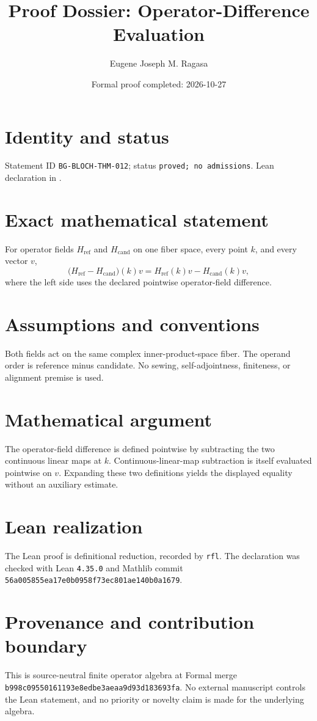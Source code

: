 \documentclass[11pt]{article}
\title{Proof Dossier: Operator-Difference Evaluation}
\author{Eugene Joseph M. Ragasa}
\date{Formal proof completed: 2026-10-27}
\begin{document}
\raggedright
\maketitle

\section{Identity and status}
Statement ID \texttt{BG-BLOCH-THM-012}; status \texttt{proved; no admissions}. Lean declaration
 in
.

\section{Exact mathematical statement}
For operator fields $H_{\mathrm{ref}}$ and $H_{\mathrm{cand}}$ on one fiber space, every
point $k$, and every vector $v$,
\[
  \bigl(H_{\mathrm{ref}}-H_{\mathrm{cand}}\bigr)(k)v
  =H_{\mathrm{ref}}(k)v-H_{\mathrm{cand}}(k)v,
\]
where the left side uses the declared pointwise operator-field difference.

\section{Assumptions and conventions}
Both fields act on the same complex inner-product-space fiber. The operand order is
reference minus candidate. No sewing, self-adjointness, finiteness, or alignment premise is used.

\section{Mathematical argument}
The operator-field difference is defined pointwise by subtracting the two continuous linear
maps at $k$. Continuous-linear-map subtraction is itself evaluated pointwise on $v$. Expanding
these two definitions yields the displayed equality without an auxiliary estimate.

\section{Lean realization}
The Lean proof is definitional reduction, recorded by \texttt{rfl}. The declaration was checked
with Lean \texttt{4.35.0} and Mathlib commit
\texttt{56a005855ea17e0b0958f73ec801ae140b0a1679}.

\section{Provenance and contribution boundary}
This is source-neutral finite operator algebra at Formal merge
\texttt{b998c09550161193e8edbe3aeaa9d93d183693fa}. No external manuscript controls the Lean
statement, and no priority or novelty claim is made for the underlying algebra.
\end{document}
